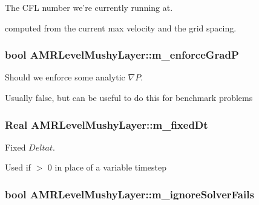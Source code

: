 The C\-F\-L number we're currently running at. 

computed from the current max velocity and the grid spacing. \hypertarget{class_a_m_r_level_mushy_layer_a731a16b4dfaecb9235357b88e251af97}{
\subsubsection[{m\-\_\-enforce\-Grad\-P}]{\setlength{\rightskip}{0pt plus 5cm}bool A\-M\-R\-Level\-Mushy\-Layer\-::m\-\_\-enforce\-Grad\-P\hspace{0.3cm}{\ttfamily [protected]}}}\label{class_a_m_r_level_mushy_layer_a731a16b4dfaecb9235357b88e251af97}


Should we enforce some analytic $ \nabla P $. 

Usually false, but can be useful to do this for benchmark problems \hypertarget{class_a_m_r_level_mushy_layer_a3111453ab5dbcb11dbf0a3e22c5ef715}{
\subsubsection[{m\-\_\-fixed\-Dt}]{\setlength{\rightskip}{0pt plus 5cm}Real A\-M\-R\-Level\-Mushy\-Layer\-::m\-\_\-fixed\-Dt\hspace{0.3cm}{\ttfamily [protected]}}}\label{class_a_m_r_level_mushy_layer_a3111453ab5dbcb11dbf0a3e22c5ef715}


Fixed $ Delta t $. 

Used if $>$ 0 in place of a variable timestep \hypertarget{class_a_m_r_level_mushy_layer_a7ddfec87b90ab2887546165b5ca7196b}{
\subsubsection[{m\-\_\-ignore\-Solver\-Fails}]{\setlength{\rightskip}{0pt plus 5cm}bool A\-M\-R\-Level\-Mushy\-Layer\-::m\-\_\-ignore\-Solver\-Fails\hspace{0.3cm}{\ttfamily [protected]}}}\label{class_a_m_r_level_mushy_layer_a7ddfec87b90ab2887546165b5ca7196b}


